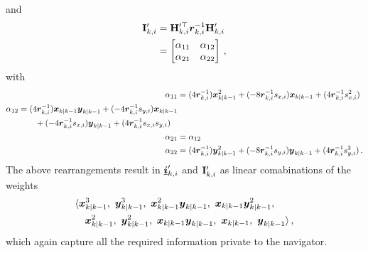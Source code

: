 \documentclass[10pt,journal,compsoc]{IEEEtran}
\theoremstyle{definition}
\theoremstyle{definition}
\theoremstyle{remark}
\begin{document}
and
\begin{equation}
    \begin{split}
        \mat{I}'_{k,i} &= \mat{H}_{k,i}^{\prime\top} \rv{r}_{k,i}^{-1}\mat{H}'_{k,i} \\
        &=
        \begin{bmatrix}
            \alpha_{11} & \alpha_{12} \\
            \alpha_{21} & \alpha_{22}
        \end{bmatrix}\,,
    \end{split} \label{eqn:hrh_linear_comb}
\end{equation}
with
\begin{align*}
    \alpha_{11} &= (4{\boldsymbol{r}}_{k,i}^{-1}){\boldsymbol{x}}_{k|k-1}^2 + (-8{\boldsymbol{r}}_{k,i}^{-1}s_{x,i}){\boldsymbol{x}}_{k|k-1} + (4{\boldsymbol{r}}_{k,i}^{-1}s_{x,i}^2) \\
    \begin{split}
        \alpha_{12} &= (4{\boldsymbol{r}}_{k,i}^{-1}){\boldsymbol{x}}_{k|k-1}{\boldsymbol{y}}_{k|k-1} + (-4{\boldsymbol{r}}_{k,i}^{-1}s_{y,i}){\boldsymbol{x}}_{k|k-1}  \\
        &\qquad+ (-4{\boldsymbol{r}}_{k,i}^{-1}s_{x,i}){\boldsymbol{y}}_{k|k-1} + (4{\boldsymbol{r}}_{k,i}^{-1}s_{x,i}s_{y,i})
    \end{split}\\
    \alpha_{21} &= \alpha_{12} \\
    \alpha_{22} &= (4{\boldsymbol{r}}_{k,i}^{-1}){\boldsymbol{y}}_{k|k-1}^2 + (-8{\boldsymbol{r}}_{k,i}^{-1}s_{y,i}){\boldsymbol{y}}_{k|k-1} + (4{\boldsymbol{r}}_{k,i}^{-1}s_{y,i}^2)\,.
\end{align*}
The above rearrangements result in ${\boldsymbol{\underline{i}}}'_{k,i}$ and ${{\mathbf{I}}}'_{k,i}$ as linear comabinations of the weights 
\begin{equation}
    \begin{split}
        &\langle \rv{x}_{k|k-1}^3,\ \rv{y}_{k|k-1}^3,\ \rv{x}_{k|k-1}^2\rv{y}_{k|k-1},\ \rv{x}_{k|k-1}\rv{y}_{k|k-1}^2,\\
        &\quad \rv{x}_{k|k-1}^2,\ \rv{y}_{k|k-1}^2,\ \rv{x}_{k|k-1}\rv{y}_{k|k-1},\ \rv{x}_{k|k-1},\ \rv{y}_{k|k-1}\rangle\,,
    \end{split} \label{eqn:weights_to_broadcast}
\end{equation}
which again capture all the required information private to the navigator.
\end{document}
